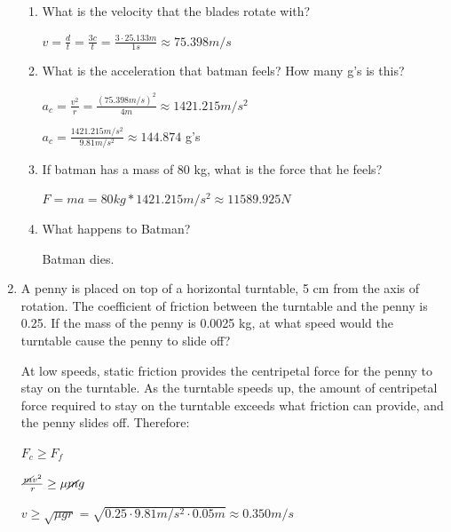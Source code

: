 \documentclass[letterpaper, 12pt]{article}
\begin{document}
\begin{enumerate}
\begin{enumerate}
			
			
		\item 	What is the velocity that the blades rotate with?		
			\vspace{.15in}
			\color{red}
			\begin{center}
				$v = \frac{d}{t} = \frac{3c}{t} = \frac{3\cdot 25.133m}{1 s} \approx 75.398 m/s  $ 
			\end{center}
			\color{black}
			\vspace{.25in} 	
		\item What is the acceleration that batman feels?  How many g's is this?
			\vspace{.15in}
			\color{red}
			\begin{center}
				$ a_c = \frac{v^2}{r} = \frac{(75.398 m/s)^2}{4m}  \approx 1421.215 m/s^2 $
				
				$ a_c = \frac{1421.215 m/s^2}{9.81 m/s^2} \approx 144.874$ g's
			\end{center}
			\color{black}
			\vspace{.25in} 	
		\item If batman has a mass of 80 kg, what is the force that he feels?
	\vspace{.15in}
	\color{red}
	\begin{center}
	
	
	$ F = m a = 80 kg * 1421.215 m/s^2 \approx 11589.925 N $
	\end{center}
	\color{black}
	\vspace{.25in} 	
		\item What happens to Batman?	
	\vspace{.15in}
\color{red}
\begin{center}
	
Batman dies.

\end{center}
\color{black}

	\end{enumerate}
	
	\item A penny is placed on top of a horizontal turntable, 5 cm from the axis of rotation.  The coefficient of friction between the turntable and the penny is 0.25.  If the mass of the penny is 0.0025 kg, at what speed would the turntable cause the penny to slide off?
	
	\vspace{.15in}
\color{red}
\begin{center}
	
 At low speeds, static friction provides the centripetal force for the penny to stay on the turntable. As the turntable speeds up, the amount of centripetal force required to stay on the turntable exceeds what friction can provide, and the penny slides off.  Therefore:
 
  $F_c \ge F_f $
  
  $\frac{\cancel{m}v^2}{r} \ge \mu \cancel{m} g$
  
  $v \ge \sqrt{\mu g r} = \sqrt{0.25 \cdot 9.81 m/s^2 \cdot 0.05 m} \approx 0.350 m/s $
	
\end{center}
\color{black}


\end{enumerate}
 
\end{document}
